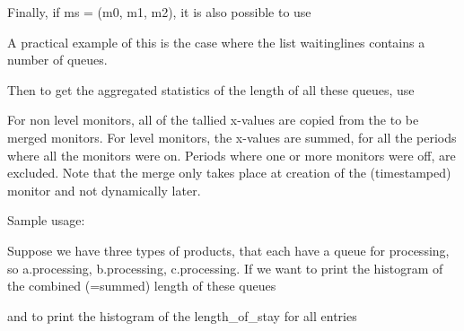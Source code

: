 \documentclass[letterpaper,10pt,english]{sphinxmanual}
\begin{document}
Finally, if ms = (m0, m1, m2), it is also possible to use

\begin{sphinxVerbatim}[commandchars=\\\{\}]
\end{sphinxVerbatim}

A practical example of this is the case where the list waitinglines contains a number of queues.

Then to get the aggregated statistics of the length of all these queues, use

\begin{sphinxVerbatim}[commandchars=\\\{\}]
    
\end{sphinxVerbatim}

For non level monitors, all of the tallied x-values are copied from the to be merged monitors.
For level monitors, the x-values are summed, for all the periods where all the monitors were on.
Periods where one or more monitors were off, are excluded.
Note that the merge only takes place at creation of the (timestamped) monitor and not dynamically later.

Sample usage:

Suppose we have three types of products, that each have a queue for processing, so
a.processing, b.processing, c.processing.
If we want to print the histogram of the combined (=summed) length of these queues

\begin{sphinxVerbatim}[commandchars=\\\{\}]
  
\end{sphinxVerbatim}

and to print the histogram of the length\_of\_stay for all entries
\end{document}
